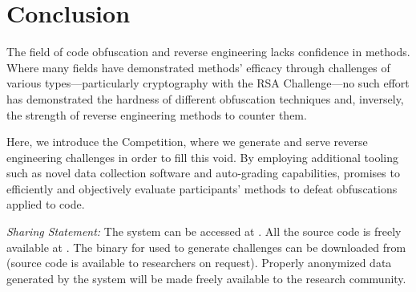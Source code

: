 \section{Conclusion} \label{conclusion}

The field of code obfuscation and reverse engineering lacks confidence in methods.  Where many fields have demonstrated methods' efficacy through challenges of various types---particularly cryptography with the RSA Challenge---no such effort has demonstrated the hardness of different obfuscation techniques and, inversely, the strength of reverse engineering methods to counter them.

Here, we introduce the \revenge Competition, where we generate and serve reverse engineering challenges in order to fill this void.  By employing additional tooling such as novel data collection software and auto-grading capabilities, \revenge promises to efficiently and objectively evaluate participants' methods to defeat obfuscations applied to code.

{\em Sharing Statement:} The \revenge system can be accessed at \revengeurl. All the source code is freely available at \sourceurl. The binary for  \tigress used to generate challenges can be downloaded from \tigressurl (source code is available to researchers on request). Properly anonymized data generated by the system will be made freely available to the research community.


